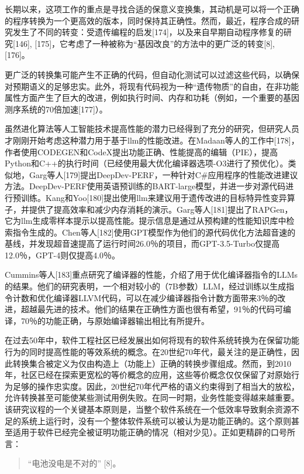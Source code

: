 \begin{translation}
长期以来，这项工作的重点是寻找合适的保意义变换集，其动机是可以将一个正确的程序转换为一个更高效的版本，同时保持其正确性。然而，最近，程序合成的研究发生了不同的转变：受遗传编程的启发[174]，以及来自早期自动程序修复的研究[146], [175]，它考虑了一种被称为“基因改良”的方法中的更广泛的转变[8], [176]。

更广泛的转换集可能产生不正确的代码，但自动化测试可以过滤这些代码，以确保对预期语义的足够忠实。此外，将现有代码视为一种“遗传物质”的自由，在非功能属性方面产生了巨大的改进，例如执行时间、内存和功耗（例如，一个重要的基因测序系统的70倍加速[177]）。

虽然进化算法等人工智能技术提高性能的潜力已经得到了充分的研究，但研究人员才刚刚开始考虑这种潜力用于基于llm的性能改进。在Madaan等人的工作中[178]，作者使用CODEGEN和CodeX提出功能正确、性能提高的编辑（PIE），提高Python和C++的执行时间（已经使用最大优化编译器选项-O3进行了预优化）。类似地，Garg等人[179]提出DeepDev-PERF，一种针对C\#应用程序的性能改进建议方法。DeepDev-PERF使用英语预训练的BART-large模型，并进一步对源代码进行预训练。Kang和Yoo[180]提出使用llm来建议用于遗传改进的目标特异性变异算子，并提供了提高效率和减少内存消耗的演示。Garg等人[181]提出了RAPGen，它为llm生成零样本提示以提高性能。提示信息是通过从预构建的性能知识库中检索指令生成的。Chen等人[182]使用GPT模型作为他们的源代码优化方法超音速的基线，并发现超音速提高了运行时间26.0％的项目，而GPT-3.5-Turbo仅提高12.0％，GPT-4则仅提高4.0％。

Cummins等人[183]重点研究了编译器的性能，介绍了用于优化编译器指令的LLMs的结果。他们的研究表明，一个相对较小的（7B参数）LLM，经过训练以生成指令计数和优化编译器LLVM代码，可以在减少编译器指令计数方面带来3％的改进，超越最先进的技术。他们的结果在正确性方面也很有希望，91％的代码可编译，70％的功能正确，与原始编译器输出相比有所提升。

在过去50年中，软件工程社区已经发展出如何将现有的软件系统转换为在保留功能行为的同时提高性能的等效系统的概念。在20世纪70年代，最关注的是正确性，因此转换集合被定义为仅由构造上（功能上）正确的转换步骤组成。然而，到2010年，社区已经在探索更宽松的等价概念的应用，这些等价概念仅仅保留了对原始行为足够的操作忠实度。因此，20世纪70年代严格的语义约束得到了相当大的放松，允许转换甚至可能使某些测试用例失败。在同一时期，业务性能变得越来越重要。该研究议程的一个关键基本原则是，当整个软件系统在一个低效率导致剩余资源不足的系统上运行时，没有一个整体软件系统可以被认为是功能正确的。这个原则甚至适用于软件已经完全被证明功能正确的情况（相对少见）。正如更精辟的口号所言：
\begin{quote}
“电池没电是不对的” [8]。
\end{quote}


\end{translation}
